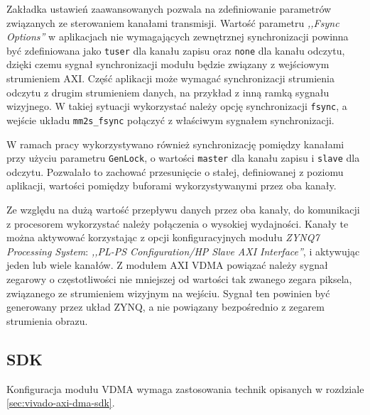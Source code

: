 Zakładka ustawień zaawansowanych pozwala na zdefiniowanie parametrów związanych ze sterowaniem kanałami transmisji.
Wartość parametru \textit{,,Fsync Options''} w aplikacjach nie wymagających zewnętrznej synchronizacji powinna być zdefiniowana jako \texttt{tuser} dla kanału zapisu oraz \texttt{none} dla kanału odczytu, dzięki czemu sygnał synchronizacji modułu będzie związany z wejściowym strumieniem AXI. 
Część aplikacji może wymagać synchronizacji strumienia odczytu z drugim strumieniem danych, na przykład z inną ramką sygnału wizyjnego. 
W takiej sytuacji wykorzystać należy opcję synchronizacji \texttt{fsync}, a wejście układu \texttt{mm2s\_fsync} połączyć z właściwym sygnałem synchronizacji.

W ramach pracy wykorzystywano również synchronizację pomiędzy kanałami przy użyciu parametru \texttt{GenLock}, o wartości \texttt{master} dla kanału zapisu i \texttt{slave} dla odczytu. 
Pozwalało to zachować przesunięcie o stałej, definiowanej z poziomu aplikacji, wartości pomiędzy buforami wykorzystywanymi przez oba kanały.

Ze względu na dużą wartość przepływu danych przez oba kanały, do komunikacji z procesorem wykorzystać należy połączenia o wysokiej wydajności. Kanały te można aktywować korzystając z opcji konfiguracyjnych modułu \emph{ZYNQ7 Processing System}: \emph{,,PL-PS Configuration/HP Slave AXI Interface''}, i aktywując jeden lub wiele kanałów.
Z modułem AXI VDMA powiązać należy sygnał zegarowy o częstotliwości nie mniejszej od wartości tak zwanego zegara piksela, związanego ze strumieniem wizyjnym na wejściu. 
Sygnał ten powinien być generowany przez układ ZYNQ, a nie powiązany bezpośrednio z zegarem strumienia obrazu.

\subsection{SDK}
Konfiguracja modułu VDMA wymaga zastosowania technik opisanych w rozdziale \ref{sec:vivado-axi-dma-sdk}.

